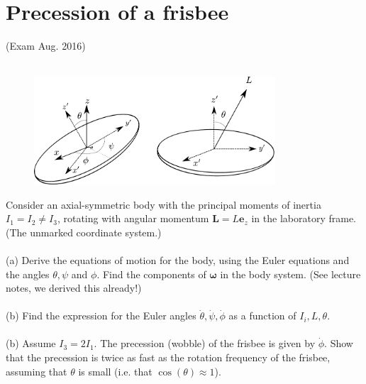 \documentclass{article}
\begin{document}
    \section{Precession of a frisbee}
        (Exam Aug. 2016) \\ \\
        \begin{figure}
            \centering
            \includegraphics[width=0.8\textwidth]{figures/exercise_2_frisbee.pdf}
        \end{figure}
        Consider an axial-symmetric body with the principal moments of inertia $I_1 = I_2 \neq I_3$, rotating with angular momentum $\mathbf{L} = L \mathbf{e}_z$ in the laboratory frame. (The unmarked coordinate system.)
        \\ \\
        (a) Derive the equations of motion for the body, using the Euler equations and the angles $\theta, \psi$ and $\phi$. Find the components of $\boldsymbol{\omega}$ in the body system. (See lecture notes, we derived this already!)
        \\ \\
        (b) Find the expression for the Euler angles $\dot \theta, \dot \psi, \dot \phi$ as a function of $I_i, L, \theta$.
        \\ \\
        (b) Assume $I_3 = 2I_1$. The precession (wobble) of the frisbee is given by $\dot \phi$. Show that the precession is twice as fast as the rotation frequency of the frisbee, assuming that $\theta$ is small (i.e. that $\cos(\theta) \approx 1$).
\end{document}
